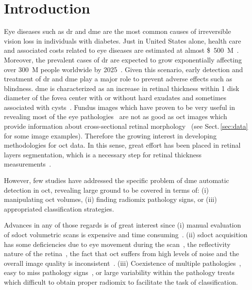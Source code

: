 \graphicspath{ {./content/intro/figures/} }

\section{Introduction}
\label{sec:intro}  %

    Eye diseases such as \gls{dr} and \gls{dme} are the most common causes of irreversible vision loss in individuals with diabetes.
 Just in United States alone, health care and associated costs related to eye diseases are estimated at almost \SI{500}[\$]{M}~\cite{Sharma2005}.
 Moreover, the prevalent cases of \gls{dr} are expected to grow exponentially affecting over \SI{300}{M} people worldwide by 2025~\cite{Wild2004}.
 Given this scenario, early detection and treatment of \gls{dr} and \gls{dme} play a major role to prevent adverse effects such as blindness.
 \gls{dme} is characterized as an increase in retinal thickness within 1 disk diameter of the fovea center with or without hard exudates and sometimes associated with cysts~\cite{ETDRSG1985}.
 Fundus images which have proven to be very useful in revealing most of the eye pathologies~\cite{Mookiah20132136,Trucco2013} are not as good as \gls{oct} images which provide information about cross-sectional retinal morphology~\cite{Wang2015} (see Sect.\,\ref{sec:data} for some image examples).
 Therefore the growing interest in developing methodologies for \gls{oct} data.
 In this sense, great effort has been placed in retinal layers segmentation,
 which is a necessary step for retinal thickness measurements~\cite{Chiu2010,Kafieh2013}.

 However, few studies have addressed the specific problem of \gls{dme} automatic detection in \gls{oct}, revealing large ground to be covered in terms of: (i) manipulating \gls{oct} volumes, (ii) finding radiomix pathology signs, or (iii) appropriated classification strategies.

 Advances in any of those regards is of great interest since (i) manual evaluation of \gls{sdoct} volumetric scans is expensive and time consuming~\cite{Venhuizen2015}.
 (ii) \gls{sdoct} acquisition has some deficiencies due to eye movement during the scan~\cite{Liu2011}, the reflectivity nature of the retina~\cite{schuman2004optical}, the fact that \gls{oct} suffers from high levels of noise and the overall image quality is inconsistent~\cite{barnum2008local}.
 (iii) Coexistence of multiple pathologies~\cite{Liu2011}, easy to miss pathology signs~\cite{Venhuizen2015}, or large variability within the pathology treats which difficult to obtain proper radiomix to facilitate the task of classification.

